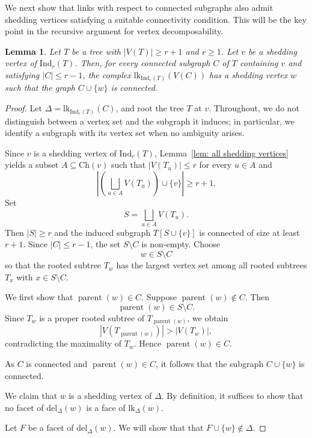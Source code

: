\documentclass[12pt,reqno]{amsart}
\newtheorem{lemma}[theorem]{Lemma}
\theoremstyle{definition}
\def\Ind{\mathrm{Ind}}
\def\del{\mathrm{del}}
\def\lk{\mathrm{lk}}
\def\Ch{\mathrm{Ch}}
\begin{document}
\medskip

We next show that links with respect to connected subgraphs also admit shedding vertices satisfying a suitable connectivity condition. This will be the key point in the recursive argument for vertex decomposability.

\begin{lemma}\label{lem: existence of shedding vertex in link}
Let $T$ be a tree with $|V(T)| \ge r+1$ and $r \ge 1$. Let $v$ be a shedding vertex of $\Ind_r(T)$. Then, for every connected subgraph $C$ of $T$ containing $v$ and satisfying $|C| \le r-1$, the complex $\lk_{\Ind_r(T)}(V(C))$ has a shedding vertex $w$ such that the graph $C\cup\{w\}$ is connected.
\end{lemma}
\begin{proof}
Let $\Delta = \lk_{\Ind_r(T)}(C)$, and root the tree $T$ at $v$. Throughout, we do not distinguish between a vertex set and the subgraph it induces; in particular, we identify a subgraph with its vertex set when no ambiguity arises.

Since $v$ is a shedding vertex of $\Ind_r(T)$, Lemma~\ref{lem: all shedding vertices} yields a subset $A\subseteq \Ch(v)$ such that $|V(T_u)|\le r$ for every $u\in A$ and
\[
\left|\left(\bigsqcup_{u\in A}V(T_u)\right)\cup\{v\}\right|
\ge r+1.
\]
Set
\[
S=\bigsqcup_{u\in A}V(T_u).
\]
Then $|S|\ge r$ and the induced subgraph $T[S \cup \{v\}]$ is connected of size at least $r+1$. Since $|C|\le r-1$, the set $S\setminus C$ is non-empty. Choose
\[
w\in S\setminus C
\]
so that the rooted subtree \(T_w\) has the largest vertex set among all rooted subtrees \(T_x\) with \(x \in S \setminus C\).

We first show that $\operatorname{parent}(w)\in C$. Suppose $\operatorname{parent}(w) \notin C$. Then
\[
\operatorname{parent}(w)\in S\setminus C.
\]
Since $T_w$ is a proper rooted subtree of $T_{\operatorname{parent}(w)}$, we obtain
\[
|V(T_{\operatorname{parent}(w)})|
>
|V(T_w)|,
\]
contradicting the maximality of $T_w$. Hence $\operatorname{parent}(w)\in C$.

As $C$ is connected and $\operatorname{parent}(w)\in C$, it follows that the subgraph $C\cup\{w\}$ is connected.

We claim that \(w\) is a shedding vertex of \(\Delta\). By definition, it suffices to show that no facet of \(\del_\Delta(w)\) is a face of \(\lk_\Delta(w)\).

Let \(F\) be a facet of \(\del_\Delta(w)\). We will show that that $F\cup\{w\}\notin\Delta$.


\end{proof}
\end{document}
